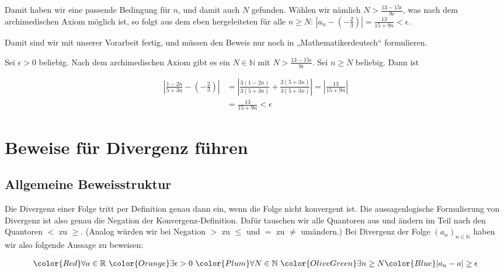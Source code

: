 \documentclass[fontsize=9pt,
               parskip=half-,
               DIV=14,
               listof=chapterentry,
               tocflat]{scrbook}
\newenvironment{indentblock}{\begin{adjustwidth}{.5cm}{}}{\end{adjustwidth}}
\begin{document}
\begin{solutionprocess*}
\begin{indentblock}
Damit haben wir eine passende Bedingung für $n$, und damit auch $N$ gefunden. Wählen wir nämlich $N>{\tfrac {13-15\epsilon }{9\epsilon }}$, was nach dem archimedischen Axiom möglich ist, so folgt aus dem eben hergeleiteten für alle $n\geq N$: $|a_{n}-(-{\tfrac {2}{3}})|={\tfrac {13}{15+9n}}<\epsilon $.

\end{indentblock}

Damit sind wir mit unserer Vorarbeit fertig, und müssen den Beweis nur noch in „Mathematikerdeutsch“ formulieren.

\end{solutionprocess*}

\begin{proof*}
Sei $\epsilon >0$ beliebig. Nach dem archimedischen Axiom gibt es ein $N\in \mathbb {N} $ mit $N>{\frac {13-15\epsilon }{9\epsilon }}$. Sei $n\geq N$ beliebig. Dann ist

\begin{align*}
\left|{\frac {1-2n}{5+3n}}-\left(-{\frac {2}{3}}\right)\right|&=\left|{\frac {3(1-2n)}{3(5+3n)}}+{\frac {2(5+3n)}{3(5+3n)}}\right|=\left|{\frac {13}{15+9n}}\right|\\[0.5em]&={\frac {13}{15+9n}}<\epsilon 
\end{align*}

\end{proof*}

\section{Beweise für Divergenz führen}

\subsection{Allgemeine Beweisstruktur}

Die Divergenz einer Folge tritt per Definition genau dann ein, wenn die Folge nicht konvergent ist. Die aussagenlogische Formulierung von Divergenz ist also genau die Negation der Konvergenz-Definition. Dafür tauschen wir alle Quantoren aus und ändern im Teil nach den Quantoren $<$ zu $\geq $. (Analog würden wir bei Negation $>$ zu $\leq $ und $=$ zu $\neq $ umändern.) Bei Divergenz der Folge $(a_{n})_{n\in \mathbb {N} }$ haben wir also folgende Aussage zu beweisen:

\begin{align*}
{\color {Red}\forall a\in \mathbb {R} }\ {\color {Orange}\exists \epsilon >0}\ {\color {Plum}\forall N\in \mathbb {N} }\ {\color {OliveGreen}\exists n\geq N}{\color {Blue}|a_{n}-a|\geq \epsilon }
\end{align*}
\end{document}

